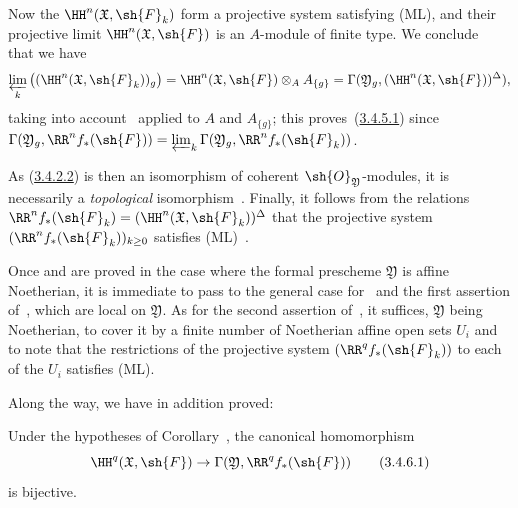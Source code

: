 \begin{env}[3.4.5]
Now the $\HH^n(\mathfrak{X},\sh{F}_k)$ form a projective system satisfying (ML), and their projective limit $\HH^n(\mathfrak{X},\sh{F})$ is an $A$-module of finite type.
We conclude~ that we have
\[
  \varprojlim_k\big((\HH^n(\mathfrak{X},\sh{F}_k))_g\big)=\HH^n(\mathfrak{X},\sh{F})\otimes_A A_{\{g\}}=\Gamma(\mathfrak{Y}_g,(\HH^n(\mathfrak{X},\sh{F}))^\Delta),
\]
taking into account~ applied to $A$ and $A_{\{g\}}$; this proves~(\hyperref[III.3.4.5.1]{3.4.5.1}) since $\Gamma(\mathfrak{Y}_g,\RR^n f_*(\sh{F}))=\varprojlim_k\Gamma(\mathfrak{Y}_g,\RR^n f_*(\sh{F}_k))$.

As (\hyperref[III.3.4.2.2]{3.4.2.2}) is then an isomorphism of coherent $\sh{O}_\mathfrak{Y}$-modules, it is necessarily a \emph{topological} isomorphism~.
Finally, it follows from the relations $\RR^n f_*(\sh{F}_k)=(\HH^n(\mathfrak{X},\sh{F}_k))^\Delta$ that the projective system $(\RR^n f_*(\sh{F}_k))_{k\geq 0}$ satisfies (ML)~.

Once  and  are proved in the case where the formal prescheme $\mathfrak{Y}$ is affine Noetherian, it is immediate to pass to the general case for~ and the first assertion of~, which are local on $\mathfrak{Y}$.
As for the second assertion of~, it suffices, $\mathfrak{Y}$ being Noetherian, to cover it by a finite number of Noetherian affine open sets $U_i$ and to note that the restrictions of the projective system $(\RR^q f_*(\sh{F}_k))$ to each of the $U_i$ satisfies (ML).
\end{env}

Along the way, we have in addition proved:
\begin{corollary}[3.4.6]
\label{III.3.4.6}
Under the hypotheses of Corollary~, the canonical homomorphism
\[
\label{III.3.4.6.1}
  \HH^q(\mathfrak{X},\sh{F})\to\Gamma(\mathfrak{Y},\RR^q f_*(\sh{F}))
  \tag{3.4.6.1}
\]
is bijective.
\end{corollary}
